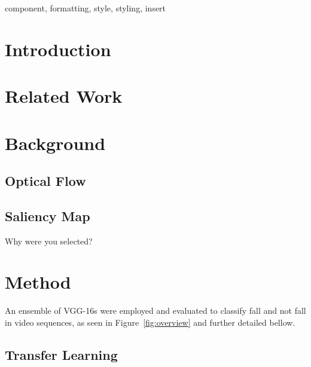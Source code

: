 \documentclass[conference]{IEEEtran}
\begin{document}
\begin{IEEEkeywords}
component, formatting, style, styling, insert
\end{IEEEkeywords}

\section{Introduction}

\section{Related Work}

\section{Background}

\subsection{Optical Flow}

\subsection{Saliency Map}
\label{sec:saliency}

Why were you selected?

\section{Method}

An ensemble of VGG-16s were employed and evaluated to classify fall and not fall in video sequences, as seen in Figure~\ref{fig:overview} and further detailed bellow.


\subsection{Transfer Learning}
\end{document}
